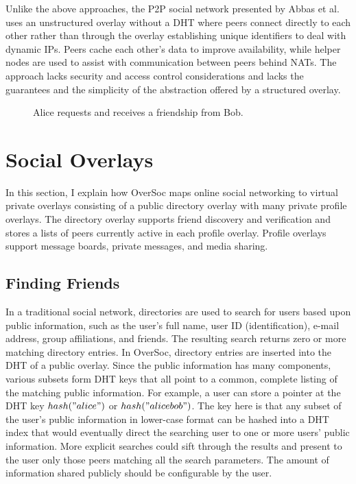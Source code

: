 Unlike the above approaches, the P2P social network presented by Abbas et
al.~\cite{tribler-osn} uses an unstructured overlay without a DHT where peers
connect directly to each other rather than through the overlay establishing
unique identifiers to deal with dynamic IPs.  Peers cache each other's data to
improve availability, while helper nodes are used to assist with communication
between peers behind NATs.  The approach lacks security and access control
considerations and lacks the guarantees and the simplicity of the abstraction
offered by a structured overlay.

\begin{figure}
\centering
{}
\caption{Alice requests and receives a friendship from Bob.}
\label{fig:friend_request}
\end{figure}

\section{Social Overlays}
\label{vpo:social_overlays}

In this section, I explain how OverSoc maps online social networking to virtual
private overlays consisting of a public directory overlay with many private
profile overlays.  The directory overlay supports friend discovery and
verification and stores a lists of peers currently active in each profile
overlay.  Profile overlays support message boards, private messages, and media
sharing.

\subsection{Finding Friends}

In a traditional social network, directories are used to search for users based
upon public information, such as the user's full name, user ID
(identification), e-mail address, group affiliations, and friends.  The
resulting search returns zero or more matching directory entries.  In OverSoc,
directory entries are inserted into the DHT of a public overlay.  Since the
public information has many components, various subsets form DHT keys that all
point to a common, complete listing of the matching public information.  For
example, a user can store a pointer at the DHT key $hash("alice")$ or
$hash("alice bob")$.  The key here is that any subset of the user's public
information in lower-case format can be hashed into a DHT index that would
eventually direct the searching user to one or more users' public information.
More explicit searches could sift through the results and present to the user
only those peers matching all the search parameters.  The amount of information
shared publicly should be configurable by the user.

